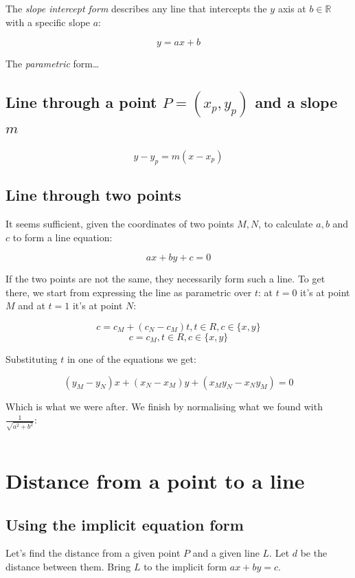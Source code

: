 \documentclass[12pt,openany,a4,usenames,dvipsnames]{book}
\begin{document}
The \emph{slope intercept form} describes any line that intercepts the $y$ axis at $b \in{} \mathbb{R}$ with a specific slope $a$:

$$y=ax+b$$

The \emph{parametric} form\ldots{} %


\section{Line through a point $P=(x_p,y_p)$ and a slope $m$}

$$y-y_p=m(x-x_p)$$

\section{Line through two points}
\begin{figure}[H]
\centering

\end{figure}
It seems sufficient, given the coordinates of two points $M, N$, to calculate $a, b$ and $c$ to form a line equation:

$$ax+by+c=0$$

If the two points are not the same, they necessarily form such a line. To get there, we start from expressing the line as parametric over $t$: at $t=0$ it's at point $M$ and at $t=1$ it's at point $N$:

$$c = c_M + (c_N - c_M)t, t\in R, c \in \{x, y\}$$
$$c = c_M, t\in R, c \in \{x, y\}$$

Substituting $t$ in one of the equations we get:

$$(y_M - y_N)x + (x_N-x_M)y+(x_{M}y_{N}-x_{N}y_{M})=0$$

Which is what we were after. We finish by normalising what we found with $\frac{1}{\sqrt{a^2+b^2}}$:
\begin{verbatim}
\end{verbatim}

\chapter{Distance from a point to a line}
\begin{figure}[H]
\centering

\end{figure}

\section{Using the implicit equation form}
Let's find the distance from a given point $P$ and a given line $L$. Let $d$ be the distance between them. Bring $L$ to the implicit form $ax+by=c$.
\end{document}
